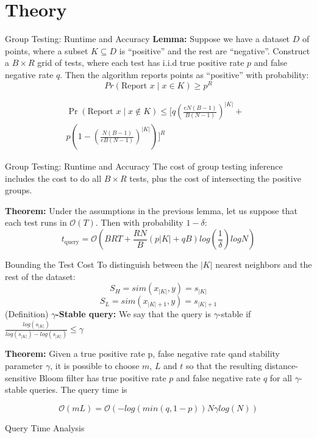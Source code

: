 \documentclass[Serif, 10pt, brown]{beamer}
\theoremstyle{example}
\theoremstyle{plain}
\begin{document}
\section{Theory}
\begin{frame}{Group Testing: Runtime and Accuracy}
\textbf{Lemma:} Suppose we have a dataset $D$ of points, where a subset $K \subseteq D$ is ``positive'' and the rest are ``negative''. Construct a $B \times R$ grid of tests, where each test has i.i.d true positive rate $p$ and false negative rate $q$. Then the algorithm reports points as ``positive''	with probability:
\[
Pr(\text{Report } x \mid x \in K) \geq p^R
\]

\[
\begin{aligned}
\Pr(\text{Report } x \mid x \notin K) \leq 
\bigg[ q\left(\frac{eN(B-1)}{B(N-1)}\right)^{|K|} 
+ {} & \\
p\left(1 - \left(\frac{N(B-1)}{eB(N-1)}\right)^{|K|}\right) \bigg]^R &
\end{aligned}
\]
\end{frame}

\begin{frame}{Group Testing: Runtime and Accuracy}
	The cost of group testing inference includes the cost to do all $B \times R$ tests, plus the cost of intersecting the positive groups. 

	\textbf{Theorem:} Under the assumptions in the previous lemma, let us suppose that each test runs in $\mathcal{O}(T)$. Then with probability $1 - \delta$:
	\[
	t_{\text{query}} = \mathcal{O}\left(BRT + \frac{RN}{B}(p|K| + qB)log(\frac{1}{\delta})logN\right)
	\]
\end{frame}

\begin{frame}{Bounding the Test Cost}
	To distinguish between the $|K|$ nearest neighbors and the rest of the dataset:
	\[S_H = sim(x_{|K|}, y) = s_{|K|}\]
	\[S_L = sim(x_{|K| + 1}, y) = s_{|K| + 1}\]
	(Definition) $\gamma${\bf -Stable query:} We say that the query is $\gamma$-stable if $\frac{log(s_{|K|})}{log(s_{|K|}) - log(s_{|K|})} \leq \gamma$

	\vspace{0.5cm}
	\textbf{Theorem:} Given a true positive rate p, false negative rate qand stability parameter $\gamma$, it is possible to choose $m$, $L$ and $t$ so that the resulting distance-sensitive Bloom filter has true positive rate $p$ and false negative rate $q$ for all $\gamma$-stable queries. The query time is

	\[\mathcal{O}(mL) = \mathcal{O}(-log(min(q,1-p))N\gamma log(N))\]
\end{frame}


\begin{frame}{Query Time Analysis}
	
\end{frame}
\end{document}

